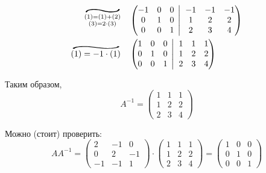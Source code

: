 \documentclass[a4paper,12pt]{article}
\newcommand\widesim[1]{\ThisStyle{%
  \setbox0=\hbox{$\SavedStyle#1$}%
  \stackengine{-.1\LMpt}{$\SavedStyle#1$}{%
    \stretchto{\scaleto{\SavedStyle\mkern.2mu\sim}{.5150\wd0}}{.6\ht0}%
  }{O}{c}{F}{T}{S}%
}}
\newcommand{\BigMiddleThree}{\;\left|\vphantom{\begin{pmatrix} 0\\0\\0 \end{pmatrix}}\right.\;}
\begin{document}
\begin{solution}
\begin{equation*}
\begin{split}
      \widesim{\substack{(1) = (1) + (2)\\(3) = 2 \cdot (3)}}\quad &\left(
        \begin{matrix}
          -1 & 0 & 0\\
          0 & 1 & 0\\
          0 & 0 & 1
        \end{matrix}
        \BigMiddleThree
        \begin{matrix}
          -1 & -1 & -1\\
          1 & 2 & 2\\
          2 & 3 & 4
        \end{matrix}
        \right)\\
      \widesim{(1) = -1 \cdot (1)}\quad &\left(
        \begin{matrix}
          1 & 0 & 0\\
          0 & 1 & 0\\
          0 & 0 & 1
        \end{matrix}
        \BigMiddleThree
        \begin{matrix}
          1 & 1 & 1\\
          1 & 2 & 2\\
          2 & 3 & 4
        \end{matrix}
        \right)
    \end{split}
    \end{equation*}
    
    Таким образом,
    \[
      A^{-1} = \begin{pmatrix}
        1 & 1 & 1\\
        1 & 2 & 2\\
        2 & 3 & 4
      \end{pmatrix}
    \]
    
    Можно (стоит) проверить:
    \[
      AA^{-1} = \begin{pmatrix}
        2 & -1 & 0\\
        0 & 2 & -1\\
        -1 & -1 & 1
      \end{pmatrix}
      \cdot \begin{pmatrix}
        1 & 1 & 1\\
        1 & 2 & 2\\
        2 & 3 & 4
      \end{pmatrix}
      = \begin{pmatrix}
        1 & 0 & 0\\
        0 & 1 & 0\\
        0 & 0 & 1
      \end{pmatrix}
    \]
    

\end{solution}
\end{document}

